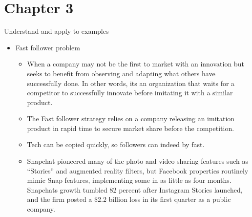 \documentclass{report}
\begin{document}
\chapter*{Chapter 3}
Understand and apply to examples
\begin{itemize}
    \item Fast follower problem 
        \begin{itemize}[label=$\circ$]
            \item When a company may not be the first to market with an innovation but seeks to benefit from observing and adapting what others have successfully done. In other words, its an organization that waits for a competitor to successfully innovate before imitating it with a similar product.
            \item The Fast follower strategy relies on a company releasing an imitation product in rapid time to secure market share before the competition.
            \item Tech can be copied quickly, so followers can indeed by fast.
            \item Snapchat pioneered many of the photo and video sharing features such as ``Stories'' and augmented reality filters, but Facebook properties routinely mimic Snap features, implementing some in as little as four months. Snapchats growth tumbled 82 percent after Instagram Stories launched, and the firm posted a \$2.2 billion loss in its first quarter as a public company.
                


\end{itemize}
\end{itemize}
\end{document}
